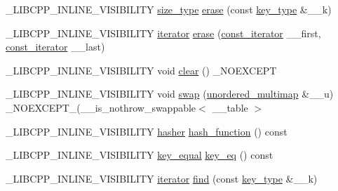 \begin{DoxyCompactItemize}
\item 
\+\_\+\+L\+I\+B\+C\+P\+P\+\_\+\+I\+N\+L\+I\+N\+E\+\_\+\+V\+I\+S\+I\+B\+I\+L\+I\+T\+Y \hyperlink{classunordered__multimap_a977c4093df6d4d0302f280de19af4b58}{size\+\_\+type} \hyperlink{classunordered__multimap_a0be77d350685ae141ce1909e106c48b8}{erase} (const \hyperlink{classunordered__multimap_a2902747087a03531493d30e9840f67d9}{key\+\_\+type} \&\+\_\+\+\_\+k)
\item 
\+\_\+\+L\+I\+B\+C\+P\+P\+\_\+\+I\+N\+L\+I\+N\+E\+\_\+\+V\+I\+S\+I\+B\+I\+L\+I\+T\+Y \hyperlink{classunordered__multimap_a7b508cae41ac3a258ca80609ec43db47}{iterator} \hyperlink{classunordered__multimap_a029edc0319488015a1a6d30f857a6d7a}{erase} (\hyperlink{classunordered__multimap_a3cb373bd19680f9933781c04905fde39}{const\+\_\+iterator} \+\_\+\+\_\+first, \hyperlink{classunordered__multimap_a3cb373bd19680f9933781c04905fde39}{const\+\_\+iterator} \+\_\+\+\_\+last)
\item 
\+\_\+\+L\+I\+B\+C\+P\+P\+\_\+\+I\+N\+L\+I\+N\+E\+\_\+\+V\+I\+S\+I\+B\+I\+L\+I\+T\+Y void \hyperlink{classunordered__multimap_a0686ae3fd40129c8dfdb2f5cf68d55cf}{clear} () \+\_\+\+N\+O\+E\+X\+C\+E\+P\+T
\item 
\+\_\+\+L\+I\+B\+C\+P\+P\+\_\+\+I\+N\+L\+I\+N\+E\+\_\+\+V\+I\+S\+I\+B\+I\+L\+I\+T\+Y void \hyperlink{classunordered__multimap_af0dc5f87b558ec6c3b2ff58d1852b80a}{swap} (\hyperlink{classunordered__multimap}{unordered\+\_\+multimap} \&\+\_\+\+\_\+u) \+\_\+\+N\+O\+E\+X\+C\+E\+P\+T\+\_\+(\+\_\+\+\_\+is\+\_\+nothrow\+\_\+swappable$<$ \+\_\+\+\_\+table $>$
\item 
\+\_\+\+L\+I\+B\+C\+P\+P\+\_\+\+I\+N\+L\+I\+N\+E\+\_\+\+V\+I\+S\+I\+B\+I\+L\+I\+T\+Y \hyperlink{classunordered__multimap_a93affc33f5ee930cff353ff62d20daef}{hasher} \hyperlink{classunordered__multimap_a20a2773161f7cd24559c6403d33258ad}{hash\+\_\+function} () const 
\item 
\+\_\+\+L\+I\+B\+C\+P\+P\+\_\+\+I\+N\+L\+I\+N\+E\+\_\+\+V\+I\+S\+I\+B\+I\+L\+I\+T\+Y \hyperlink{classunordered__multimap_aeed817e3baaf0771b8336eb2477f4f02}{key\+\_\+equal} \hyperlink{classunordered__multimap_a745f38978a7f48c40f6f596c7063c592}{key\+\_\+eq} () const 
\item 
\+\_\+\+L\+I\+B\+C\+P\+P\+\_\+\+I\+N\+L\+I\+N\+E\+\_\+\+V\+I\+S\+I\+B\+I\+L\+I\+T\+Y \hyperlink{classunordered__multimap_a7b508cae41ac3a258ca80609ec43db47}{iterator} \hyperlink{classunordered__multimap_a20a8a9776e47dac719946a9e14597d20}{find} (const \hyperlink{classunordered__multimap_a2902747087a03531493d30e9840f67d9}{key\+\_\+type} \&\+\_\+\+\_\+k)
\item 

\end{DoxyCompactItemize}
